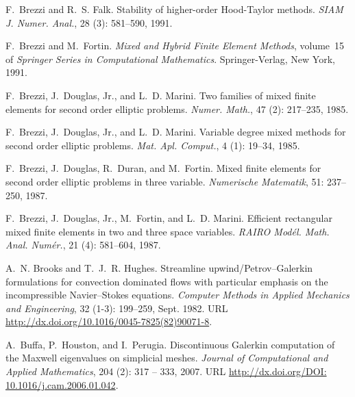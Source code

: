 \begin{thebibliography}{467}
F.~Brezzi and R.~S. Falk.
\newblock Stability of higher-order {H}ood-{T}aylor methods.
\newblock \emph{SIAM J. Numer. Anal.}, 28 (3): 581--590,
  1991.

F.~Brezzi and M.~Fortin.
\newblock \emph{Mixed and Hybrid Finite Element Methods}, volume~15 of
  \emph{Springer Series in Computational Mathematics}.
\newblock Springer-Verlag, New York, 1991.

F.~Brezzi, J.~Douglas, Jr., and L.~D. Marini.
\newblock Two families of mixed finite elements for second order elliptic
  problems.
\newblock \emph{Numer. Math.}, 47 (2): 217--235,
  1985{}.

F.~Brezzi, J.~Douglas, Jr., and L.~D. Marini.
\newblock Variable degree mixed methods for second order elliptic problems.
\newblock \emph{Mat. Apl. Comput.}, 4 (1): 19--34,
  1985{}.

F.~Brezzi, J.~Douglas, R.~Duran, and M.~Fortin.
\newblock Mixed finite elements for second order elliptic problems in three
  variable.
\newblock \emph{Numerische Matematik}, 51: 237--250,
  1987{}.

F.~Brezzi, J.~Douglas, Jr., M.~Fortin, and L.~D. Marini.
\newblock Efficient rectangular mixed finite elements in two and three space
  variables.
\newblock \emph{RAIRO Mod\'el. Math. Anal. Num\'er.}, 21 (4):
  581--604, 1987{}.

A.~N. Brooks and T.~J.~R. Hughes.
\newblock Streamline upwind/{P}etrov--{G}alerkin formulations for convection
  dominated flows with particular emphasis on the incompressible
  {N}avier--{S}tokes equations.
\newblock \emph{Computer Methods in Applied Mechanics and Engineering},
  32 (1-3): 199--259, Sept. 1982.
\newblock URL \url{http://dx.doi.org/10.1016/0045-7825(82)90071-8}.

A.~Buffa, P.~Houston, and I.~Perugia.
\newblock Discontinuous {G}alerkin computation of the {M}axwell eigenvalues on
  simplicial meshes.
\newblock \emph{Journal of Computational and Applied Mathematics}, 204
  (2): 317 -- 333, 2007.
\newblock URL \url{http://dx.doi.org/DOI: 10.1016/j.cam.2006.01.042}.


\end{thebibliography}
